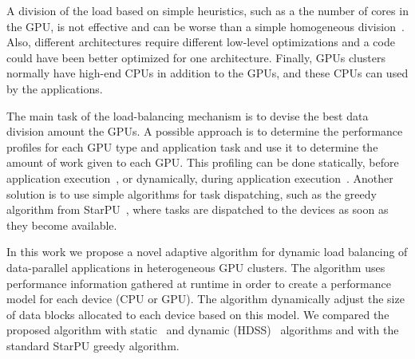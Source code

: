 \documentclass[journal]{IEEEtran}
\begin{document}
A division of the load based on simple heuristics, such as a the number of cores
in the GPU, is not effective and can be worse than a simple homogeneous
division~\cite{raphael}. Also, different architectures require different
low-level optimizations and a code could have been better optimized for one
architecture. Finally, GPUs clusters normally have high-end CPUs in addition to
the GPUs, and these CPUs can used by the applications.

%

The main task of the load-balancing mechanism is to devise the best data
division amount the GPUs. A possible approach is to determine the performance
profiles for each GPU type and application task and use it to determine the
amount of work given to each GPU. This profiling can be done statically, before
application execution~\cite{raphael}, or dynamically, during application
execution~\cite{acosta, HDSS}. Another solution is to use simple algorithms for
task dispatching, such as the greedy algorithm from StarPU~\cite{starpu}, where
tasks are dispatched to the devices as soon as they become available.

In this work we propose a novel adaptive algorithm for dynamic load balancing of
data-parallel applications in heterogeneous GPU clusters. The algorithm uses
performance information gathered at runtime in order to create a performance model for each
device (CPU or GPU). The algorithm dynamically adjust the size of data blocks
allocated to each device based on this model. We compared the proposed algorithm
with static~\cite{raphael} and dynamic (HDSS)~\cite{HDSS} algorithms and with
the standard StarPU greedy algorithm.

% 
% 
% 
% 
\end{document}
